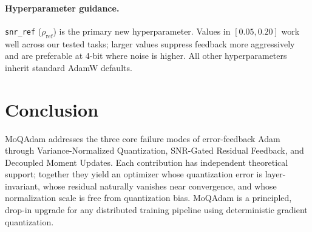 \documentclass[10pt,twocolumn]{article}
\begin{document}
\paragraph{Hyperparameter guidance.}
\texttt{snr\_ref} ($\rho_{\text{ref}}$) is the primary new
hyperparameter.  Values in $[0.05, 0.20]$ work well across our tested
tasks; larger values suppress feedback more aggressively and are
preferable at 4-bit where noise is higher.  All other hyperparameters
inherit standard AdamW defaults.

\section{Conclusion}

MoQAdam addresses the three core failure modes of error-feedback Adam
through Variance-Normalized Quantization, SNR-Gated Residual Feedback,
and Decoupled Moment Updates.  Each contribution has independent
theoretical support; together they yield an optimizer whose quantization
error is layer-invariant, whose residual naturally vanishes near
convergence, and whose normalization scale is free from quantization
bias.  MoQAdam is a principled, drop-in upgrade for any distributed
training pipeline using deterministic gradient quantization.
\end{document}
